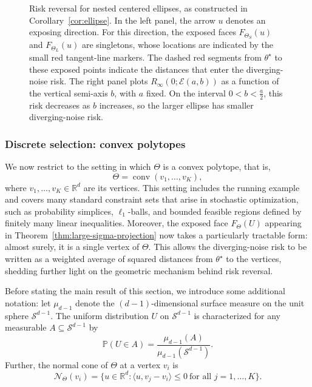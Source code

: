 \documentclass[11pt]{article}
\theoremstyle{plain}
\theoremstyle{definition}
\providecommand{\mathbbm}{\mathbb} %
\newcommand{\R}{\mathbbm{R}}
\renewcommand{\P}{\mathbb{P}}
\newcommand{\mcE}{\mathcal{E}}
\newcommand{\mcN}{\mathcal{N}}
\newcommand{\mcS}{\mathcal{S}}
\begin{document}
\begin{figure}[t]
{
}
\caption{Risk reversal for nested centered ellipses, as constructed in Corollary~\ref{cor:ellipse}. In the left panel, the arrow $u$ denotes an exposing
direction. For this direction, the exposed faces $F_{\Theta_S}(u)$ and
$F_{\Theta_L}(u)$ are singletons, whose locations are indicated by the
small red tangent-line markers. The dashed red segments from
$\theta^\star$ to these exposed points indicate the distances that enter the
diverging-noise risk. The right panel plots $R_\infty(0;\mcE(a,b))$ as a function
of the vertical semi-axis $b$, with $a$ fixed. On the interval $0<b<\frac{a}{2}$, this risk decreases as $b$ increases, so the larger ellipse has
smaller diverging-noise risk.} 
\label{fig:ellipse-risk-reversal}
\end{figure}

    




\subsubsection{Discrete selection: convex polytopes}\label{sec:cvxPolytopes}
We now restrict to the setting in which $\Theta$ is a convex polytope, that is, 
\[
\Theta = \operatorname{conv}(v_1,\dots,v_K),
\]
where $v_1,\dots,v_K \in \R^d$ are its vertices. This setting includes the running example and covers many standard constraint sets that arise in stochastic optimization, such as probability simplices, $\ell_1$-balls, and bounded feasible regions defined by finitely many linear inequalities. Moreover, the exposed face $F_\Theta(U)$ appearing in
Theorem~\ref{thm:large-sigma-projection} now takes a particularly tractable form:
almost surely, it is a single vertex of $\Theta$. This allows the
diverging-noise risk to be written as a weighted average of squared distances
from $\theta^\star$ to the vertices, shedding further light on the geometric
mechanism behind risk reversal.

Before stating the main result of this section, we introduce some additional notation: let $\mu_{d-1}$ denote the $(d-1)$-dimensional surface
measure on the unit sphere $\mcS^{d-1}$. The uniform distribution $U$ on $\mcS^{d-1}$ is characterized for any measurable $A\subseteq \mcS^{d-1}$ by
\[
\P(U\in A)=\frac{\mu_{d-1}(A)}{\mu_{d-1}(\mcS^{d-1})}.
\]
Further, the normal cone of $\Theta$ at a vertex $v_i$ is 
\[
\mcN_\Theta(v_i)
=
\{ u \in \R^d :
\langle u, v_j - v_i \rangle \le 0
\ \text{for all } j = 1,\dots,K
\}.
\]
\end{document}
